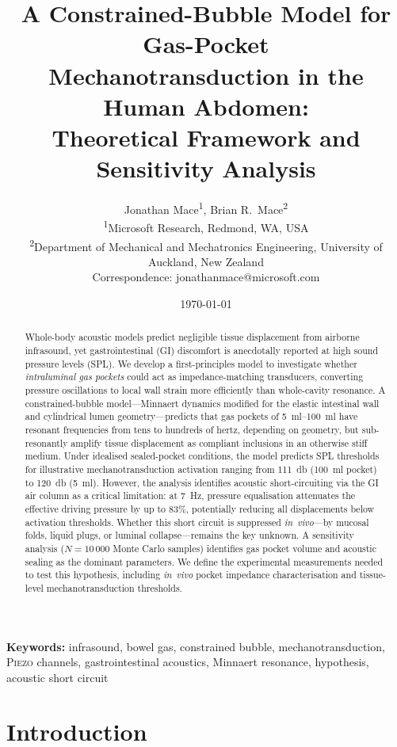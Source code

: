 \documentclass[12pt]{article}
\title{%
  A Constrained-Bubble Model for Gas-Pocket\\
  Mechanotransduction in the Human Abdomen:\\
  Theoretical Framework and Sensitivity Analysis%
}
\author{%
  Jonathan Mace\textsuperscript{1},
  Brian R.\ Mace\textsuperscript{2}\\[4pt]
  \small \textsuperscript{1}Microsoft Research, Redmond, WA, USA\\
  \small \textsuperscript{2}Department of Mechanical and Mechatronics Engineering,
         University of Auckland, New Zealand\\[2pt]
  \small Correspondence: jonathanmace@microsoft.com%
}
\date{\today}
\newcommand{\piezo}{\textsc{Piezo}}
\begin{document}
\maketitle

\begin{abstract}
Whole-body acoustic models predict negligible tissue displacement from
airborne infrasound, yet gastrointestinal (GI) discomfort is anecdotally
reported at high sound pressure levels (SPL).  We develop a first-principles
model to investigate whether \emph{intraluminal gas pockets} could act as
impedance-matching transducers, converting pressure oscillations to local
wall strain more efficiently than whole-cavity resonance.  A
constrained-bubble model---Minnaert dynamics modified for the elastic
intestinal wall and cylindrical lumen geometry---predicts that gas pockets of
\SIrange{5}{100}{\milli\litre} have resonant frequencies from tens to
hundreds of hertz, depending on geometry, but sub-resonantly amplify tissue
displacement as compliant inclusions in an otherwise stiff medium.  Under
idealised sealed-pocket conditions, the model predicts SPL thresholds for
illustrative mechanotransduction activation ranging from
\SI{111}{\decibel} (\SI{100}{\milli\litre} pocket) to \SI{120}{\decibel}
(\SI{5}{\milli\litre}).  However, the analysis identifies acoustic
short-circuiting via the GI air column as a critical limitation: at
\SI{7}{\hertz}, pressure equalisation attenuates the effective driving
pressure by up to 83\%, potentially reducing all displacements below
activation thresholds.  Whether this short circuit is suppressed
\emph{in~vivo}---by mucosal folds, liquid plugs, or luminal
collapse---remains the key unknown.  A sensitivity analysis
($N = 10\,000$ Monte Carlo samples) identifies gas pocket volume and
acoustic sealing as the dominant parameters.  We define the experimental
measurements needed to test this hypothesis, including \emph{in~vivo}
pocket impedance characterisation and tissue-level mechanotransduction
thresholds.
\end{abstract}

\noindent\textbf{Keywords:}
infrasound, bowel gas, constrained bubble, mechanotransduction,
\piezo{} channels, gastrointestinal acoustics, Minnaert resonance,
hypothesis, acoustic short circuit


\section{Introduction}
\label{sec:intro}
\end{document}
